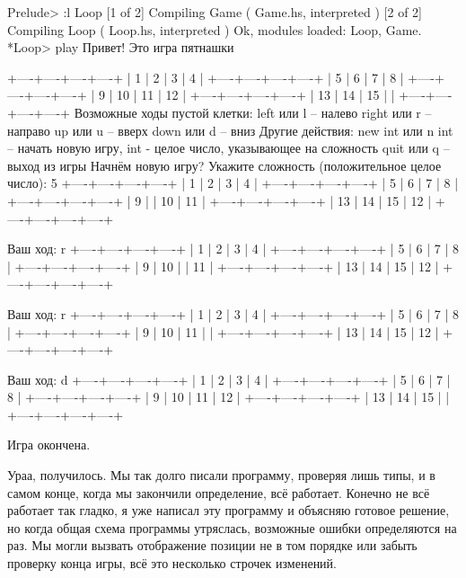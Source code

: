 \begin{code}
Prelude> :l Loop
[1 of 2] Compiling Game             ( Game.hs, interpreted )
[2 of 2] Compiling Loop             ( Loop.hs, interpreted )
Ok, modules loaded: Loop, Game.
*Loop> play
Привет! Это игра пятнашки

	+----+----+----+----+
	|  1 |  2 |  3 |  4 |
	+----+----+----+----+
	|  5 |  6 |  7 |  8 |
	+----+----+----+----+
	|  9 | 10 | 11 | 12 |
	+----+----+----+----+
	| 13 | 14 | 15 |    |
	+----+----+----+----+
Возможные ходы пустой клетки:
   left     или l       -- налево
   right    или r       -- направо
   up       или u       -- вверх
   down     или d       -- вниз
Другие действия:
   new int  или n int -- начать новую игру, int - целое число,
указывающее на сложность
   quit     или q      -- выход из игры
Начнём новую игру?
Укажите сложность (положительное целое число): 
5
	+----+----+----+----+
	|  1 |  2 |  3 |  4 |
	+----+----+----+----+
	|  5 |  6 |  7 |  8 |
	+----+----+----+----+
	|  9 |    | 10 | 11 |
	+----+----+----+----+
	| 13 | 14 | 15 | 12 |
	+----+----+----+----+

Ваш ход: 
r
	+----+----+----+----+
	|  1 |  2 |  3 |  4 |
	+----+----+----+----+
	|  5 |  6 |  7 |  8 |
	+----+----+----+----+
	|  9 | 10 |    | 11 |
	+----+----+----+----+
	| 13 | 14 | 15 | 12 |
	+----+----+----+----+

Ваш ход: 
r
	+----+----+----+----+
	|  1 |  2 |  3 |  4 |
	+----+----+----+----+
	|  5 |  6 |  7 |  8 |
	+----+----+----+----+
	|  9 | 10 | 11 |    |
	+----+----+----+----+
	| 13 | 14 | 15 | 12 |
	+----+----+----+----+

Ваш ход: 
d
	+----+----+----+----+
	|  1 |  2 |  3 |  4 |
	+----+----+----+----+
	|  5 |  6 |  7 |  8 |
	+----+----+----+----+
	|  9 | 10 | 11 | 12 |
	+----+----+----+----+
	| 13 | 14 | 15 |    |
	+----+----+----+----+

Игра окончена.
\end{code}

Ураа, получилось. Мы так долго писали программу, проверяя лишь типы, и в
самом конце, когда мы закончили определение, всё работает. Конечно не
всё работает так гладко, я уже написал эту программу и объясняю готовое
решение, но когда общая схема программы утряслась, возможные ошибки
определяются на раз. Мы могли вызвать отображение позиции не в том
порядке или забыть проверку конца игры, всё это несколько строчек
изменений.

